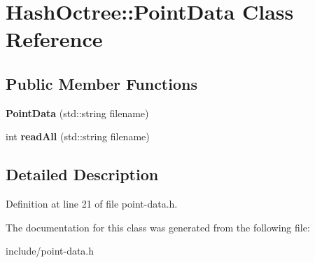 \hypertarget{class_hash_octree_1_1_point_data}{}\section{Hash\+Octree\+::Point\+Data Class Reference}
\label{class_hash_octree_1_1_point_data}
\subsection*{Public Member Functions}
\begin{DoxyCompactItemize}
\item 
\mbox{\label{class_hash_octree_1_1_point_data_a0154babe173c2519eac574ccdaf9ea53}} 
{\bfseries Point\+Data} (std\+::string filename)
\item 
\mbox{\label{class_hash_octree_1_1_point_data_ae02ff3b9e5b2ab4dd2c9c43785a16c68}} 
int {\bfseries read\+All} (std\+::string filename)
\end{DoxyCompactItemize}


\subsection{Detailed Description}


Definition at line 21 of file point-\/data.\+h.



The documentation for this class was generated from the following file\+:\begin{DoxyCompactItemize}
\item 
include/point-\/data.\+h\end{DoxyCompactItemize}
